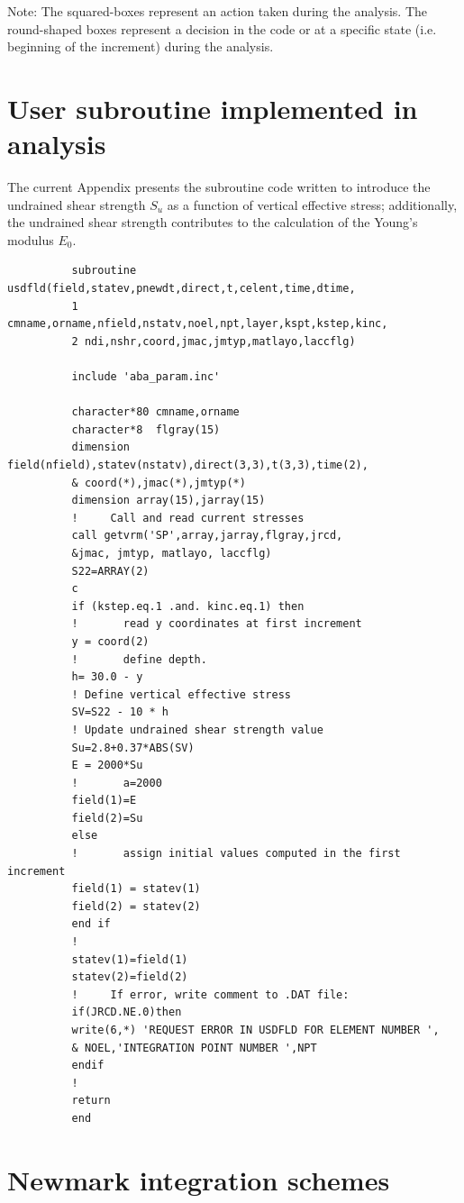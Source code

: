 \documentclass[12pt,a4paper]{report}
\begin{document}
\vspace*{3cm}
Note: The squared-boxes represent an action taken during the analysis. The round-shaped boxes represent a decision in the code or at a specific state (i.e. beginning of the increment) during the analysis.
\newpage
\chapter{User subroutine implemented in analysis} \label{subroutine}
The current Appendix presents the subroutine code written to introduce the undrained shear strength $S_u$ as a function of vertical effective stress; additionally, the undrained shear strength contributes to the calculation of the Young's modulus $E_0$.

\begin{lstlisting}
	      subroutine usdfld(field,statev,pnewdt,direct,t,celent,time,dtime,
	      1 cmname,orname,nfield,nstatv,noel,npt,layer,kspt,kstep,kinc,
	      2 ndi,nshr,coord,jmac,jmtyp,matlayo,laccflg)
	      
	      include 'aba_param.inc'
	      
	      character*80 cmname,orname
	      character*8  flgray(15)
	      dimension field(nfield),statev(nstatv),direct(3,3),t(3,3),time(2),
	      & coord(*),jmac(*),jmtyp(*)
	      dimension array(15),jarray(15)
	      !     Call and read current stresses 
	      call getvrm('SP',array,jarray,flgray,jrcd,
	      &jmac, jmtyp, matlayo, laccflg)
	      S22=ARRAY(2)
	      c
	      if (kstep.eq.1 .and. kinc.eq.1) then
	      !       read y coordinates at first increment
	      y = coord(2)
	      !       define depth. 
	      h= 30.0 - y
	      ! Define vertical effective stress
	      SV=S22 - 10 * h
	      !	Update undrained shear strength value
	      Su=2.8+0.37*ABS(SV)
	      E = 2000*Su
	      !       a=2000
	      field(1)=E
	      field(2)=Su
	      else
	      !       assign initial values computed in the first increment
	      field(1) = statev(1)
	      field(2) = statev(2)
	      end if 
	      !
	      statev(1)=field(1)
	      statev(2)=field(2)
	      !     If error, write comment to .DAT file:
	      if(JRCD.NE.0)then
	      write(6,*) 'REQUEST ERROR IN USDFLD FOR ELEMENT NUMBER ',
	      & NOEL,'INTEGRATION POINT NUMBER ',NPT
	      endif
	      !
	      return
	      end
\end{lstlisting}


\newpage
\chapter{Newmark integration schemes} \label{App:AppendixH}
\end{document}
